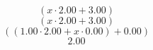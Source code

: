 \documentclass{article}
\begin{document}
\begin{equation}
(x\cdot {2.00}+{3.00})
\end{equation}
\begin{equation}
(x\cdot {2.00}+{3.00})
\end{equation}
\begin{equation}
(({1.00}\cdot {2.00}+x\cdot {0.00})+{0.00})
\end{equation}
\begin{equation}
{2.00}
\end{equation}
\end{document}
